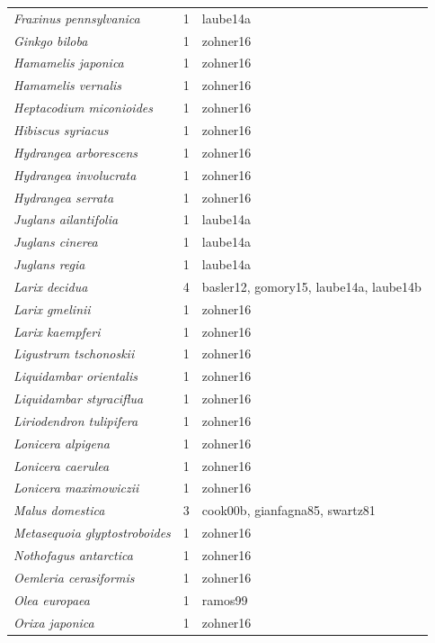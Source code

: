 \documentclass{article}
\begin{document}
\begin{footnotesize}
\begin{longtable}{p{}p{}p{}}
  \textit{Fraxinus pennsylvanica} &   1 & laube14a \\ 
  \textit{Ginkgo biloba} &   1 & zohner16 \\ 
  \textit{Hamamelis japonica} &   1 & zohner16 \\ 
  \textit{Hamamelis vernalis} &   1 & zohner16 \\ 
  \textit{Heptacodium miconioides} &   1 & zohner16 \\ 
  \textit{Hibiscus syriacus} &   1 & zohner16 \\ 
  \textit{Hydrangea arborescens} &   1 & zohner16 \\ 
  \textit{Hydrangea involucrata} &   1 & zohner16 \\ 
  \textit{Hydrangea serrata} &   1 & zohner16 \\ 
  \textit{Juglans ailantifolia} &   1 & laube14a \\ 
  \textit{Juglans cinerea} &   1 & laube14a \\ 
  \textit{Juglans regia} &   1 & laube14a \\ 
  \textit{Larix decidua} &   4 & basler12, gomory15, laube14a, laube14b \\ 
  \textit{Larix gmelinii} &   1 & zohner16 \\ 
  \textit{Larix kaempferi} &   1 & zohner16 \\ 
  \textit{Ligustrum tschonoskii} &   1 & zohner16 \\ 
  \textit{Liquidambar orientalis} &   1 & zohner16 \\ 
  \textit{Liquidambar styraciflua} &   1 & zohner16 \\ 
  \textit{Liriodendron tulipifera} &   1 & zohner16 \\ 
  \textit{Lonicera alpigena} &   1 & zohner16 \\ 
  \textit{Lonicera caerulea} &   1 & zohner16 \\ 
  \textit{Lonicera maximowiczii} &   1 & zohner16 \\ 
  \textit{Malus domestica} &   3 & cook00b, gianfagna85, swartz81 \\ 
  \textit{Metasequoia glyptostroboides} &   1 & zohner16 \\ 
  \textit{Nothofagus antarctica} &   1 & zohner16 \\ 
  \textit{Oemleria cerasiformis} &   1 & zohner16 \\ 
  \textit{Olea europaea} &   1 & ramos99 \\ 
  \textit{Orixa japonica} &   1 & zohner16 \\ 

\end{longtable}
\end{footnotesize}
\end{document}

